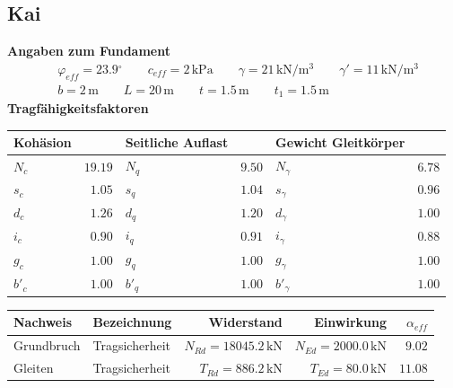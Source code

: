 \documentclass[11pt,a4paper]{article}
\begin{document}
\subsection{Kai}
\noindent\textbf{Angaben zum Fundament}
\begin{equation*}
\begin{aligned} & \varphi_{eff} = 23.9{}^{\circ} \qquad c_{eff} = 2\,\mathrm{kPa} \qquad \gamma = 21\,\mathrm{kN}/\mathrm{m}^{3} \qquad \gamma' = 11\,\mathrm{kN}/\mathrm{m}^{3} \\ & b = 2\,\mathrm{m} \qquad L = 20\,\mathrm{m} \qquad t = 1.5\,\mathrm{m} \qquad t_1 = 1.5\,\mathrm{m} \end{aligned}
\end{equation*}
\noindent\textbf{Tragfähigkeitsfaktoren}
\begin{longtable}{lrlrlr}
\hline
Kohäsion &  & Seitliche Auflast &  & Gewicht Gleitkörper &  \\
\hline
\endhead
$N_{c}$ & $19.19$ & $N_{q}$ & $9.50$ & $N_{\gamma}$ & $6.78$ \\
$s_{c}$ & $1.05$ & $s_{q}$ & $1.04$ & $s_{\gamma}$ & $0.96$ \\
$d_{c}$ & $1.26$ & $d_{q}$ & $1.20$ & $d_{\gamma}$ & $1.00$ \\
$i_{c}$ & $0.90$ & $i_{q}$ & $0.91$ & $i_{\gamma}$ & $0.88$ \\
$g_{c}$ & $1.00$ & $g_{q}$ & $1.00$ & $g_{\gamma}$ & $1.00$ \\
$b'_{c}$ & $1.00$ & $b'_{q}$ & $1.00$ & $b'_{\gamma}$ & $1.00$ \\
\hline
\end{longtable}
\begin{xltabular}{\linewidth}{>{\raggedright\arraybackslash}X>{\raggedright\arraybackslash}Xrrr}
\hline
Nachweis & Bezeichnung & Widerstand & Einwirkung & $\alpha_{eff}$ \\
\hline
\endhead
Grundbruch & Tragsicherheit & $N_{Rd} = 18045.2\,\mathrm{kN}$ & $N_{Ed} = 2000.0\,\mathrm{kN}$ & $9.02$ \\
Gleiten & Tragsicherheit & $T_{Rd} = 886.2\,\mathrm{kN}$ & $T_{Ed} = 80.0\,\mathrm{kN}$ & $11.08$ \\
\hline
\end{xltabular}
\end{document}
